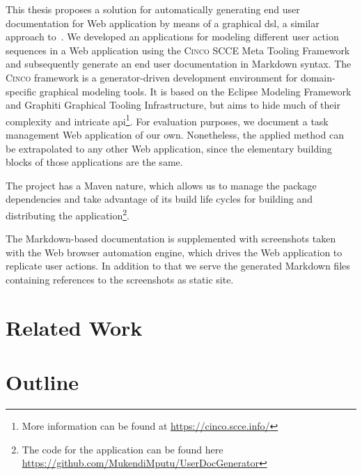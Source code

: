 This thesis proposes a solution for automatically generating end user documentation for Web application by means of a graphical \gls*{dsl}, a similar approach to~\cite{bosselmann-et_al}. We developed an applications for modeling different user action sequences in a Web application using the \textsc{Cinco} SCCE Meta Tooling Framework~\cite{Cinco} and subsequently generate an end user documentation in Markdown syntax. The \textsc{Cinco} framework is a generator-driven development environment for domain-specific graphical modeling tools. It is based on the Eclipse Modeling Framework and Graphiti Graphical Tooling Infrastructure, but aims to hide much of their complexity and intricate \gls{api}\footnote{More information can be found at \url{https://cinco.scce.info/}}. For evaluation purposes, we document a task management Web application of our own. Nonetheless, the applied method can be extrapolated to any other Web application, since the elementary building blocks of those applications are the same.

The project has a Maven nature, which allows us to manage the package dependencies and take advantage of its build life cycles for building and distributing the application\footnote{The code for the application can be found here \url{https://github.com/MukendiMputu/UserDocGenerator}}.

The Markdown-based documentation is supplemented with screenshots taken with the Web browser automation engine, which drives the Web application to replicate user actions. In addition to that we serve the generated Markdown files containing references to the screenshots as static site.

\section{Related Work}\label{sec:relWork}



\section{Outline}\label{sec:outline}

